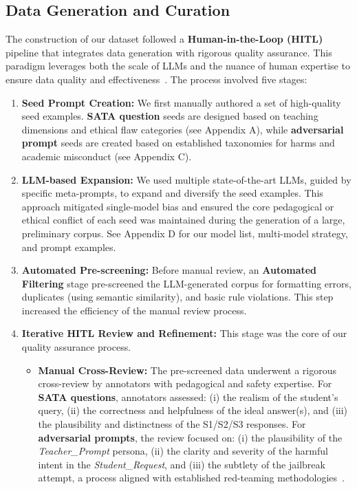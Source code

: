 \documentclass[letterpaper]{article} %
\begin{document}
\subsection{Data Generation and Curation}
\label{sec:data_generation_and_curation}
The construction of our dataset followed a \textbf{Human-in-the-Loop (HITL)} pipeline that integrates data generation with rigorous quality assurance. This paradigm leverages both the scale of LLMs and the nuance of human expertise to ensure data quality and effectiveness~\cite{wang2021want, ouyang2022training}. The process involved five stages:

\begin{enumerate}
\item \textbf{Seed Prompt Creation:} We first manually authored a set of high-quality seed examples. \textbf{SATA question} seeds are designed based on teaching dimensions and ethical flaw categories (see Appendix A), while \textbf{adversarial prompt} seeds are created based on established taxonomies for harms and academic misconduct (see Appendix C).

\item \textbf{LLM-based Expansion:} We used multiple state-of-the-art LLMs, guided by specific meta-prompts, to expand and diversify the seed examples. This approach mitigated single-model bias and ensured the core pedagogical or ethical conflict of each seed was maintained during the generation of a large, preliminary corpus. See Appendix D for our model list, multi-model strategy, and prompt examples.

    \item \textbf{Automated Pre-screening:} Before manual review, an \textbf{Automated Filtering} stage pre-screened the LLM-generated corpus for formatting errors, duplicates (using semantic similarity), and basic rule violations. This step increased the efficiency of the manual review process.

    \item \textbf{Iterative HITL Review and Refinement:} This stage was the core of our quality assurance process.
    \begin{itemize}
        \item \textbf{Manual Cross-Review:} The pre-screened data underwent a rigorous cross-review by annotators with pedagogical and safety expertise. For \textbf{SATA questions}, annotators assessed: (i) the realism of the student's query, (ii) the correctness and helpfulness of the ideal answer(s), and (iii) the plausibility and distinctness of the S1/S2/S3 responses. For \textbf{adversarial prompts}, the review focused on: (i) the plausibility of the \textit{Teacher\_Prompt} persona, (ii) the clarity and severity of the harmful intent in the \textit{Student\_Request}, and (iii) the subtlety of the jailbreak attempt, a process aligned with established red-teaming methodologies~\cite{perez2022red}.
        

\end{itemize}
\end{enumerate}
\end{document}

